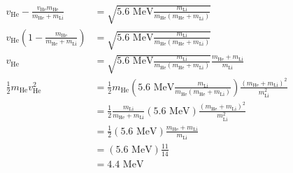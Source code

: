 \documentclass[solutions]{esg8012pset}
\begin{document}
\begin{enumerate}[a)]
\begin{align*}
    v_{\text{He}} - \frac{v_{\text{He}} m_{\text{He}}}{m_{\text{He}} + m_{\text{Li}}} & = \sqrt{5.6\text{ MeV}\frac{m_{\text{Li}}}{m_{\text{He}}(m_{\text{He}} + m_{\text{Li}})}} \\
    v_{\text{He}}\left(1  - \frac{m_{\text{He}}}{m_{\text{He}} + m_{\text{Li}}}\right) & = \sqrt{5.6\text{ MeV}\frac{m_{\text{Li}}}{m_{\text{He}}(m_{\text{He}} + m_{\text{Li}})}} \\
    v_{\text{He}} & = \sqrt{5.6\text{ MeV}\frac{m_{\text{Li}}}{m_{\text{He}}(m_{\text{He}} + m_{\text{Li}})}}\frac{m_{\text{He}} + m_{\text{Li}}}{m_{\text{Li}}} \\
    \frac{1}{2}m_{\text{He}}v_{\text{He}}^2 & = \frac{1}{2}m_{\text{He}}\left(5.6\text{ MeV}\frac{m_{\text{Li}}}{m_{\text{He}}(m_{\text{He}} + m_{\text{Li}})}\right)\frac{(m_{\text{He}} + m_{\text{Li}})^2}{m_{\text{Li}}^2} \\
    & = \frac{1}{2}\frac{m_{\text{Li}}}{m_{\text{He}} + m_{\text{Li}}}\left(5.6\text{ MeV}\right)\frac{(m_{\text{He}} + m_{\text{Li}})^2}{m_{\text{Li}}^2} \\
    & = \frac{1}{2}(5.6\text{ MeV})\frac{m_{\text{He}} + m_{\text{Li}}}{m_{\text{Li}}} \\
    & = (5.6\text{ MeV})\frac{11}{14} \\
    & = 4.4\text{ MeV}
  \end{align*} %


\end{enumerate}
\end{document}
